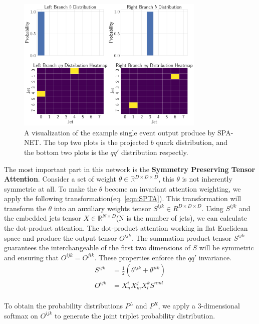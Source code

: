\begin{figure}[H]
	\centering
	\includegraphics[width=0.8\textwidth]{Figures/typical_output.pdf}
	\caption{A visualization of the example single event output produce by SPA-NET. The top two plots is the projected $b$ quark distribution, and the bottom two plots is the $qq'$ distribution respectly. }
	\label{fig:output}
\end{figure}
The most important part in this network is the \textbf{Symmetry Preserving Tensor Attention}. Consider a set of weight $\theta \in \mathbb{R}^{D\times D\times D}$, this $\theta$ is not inherently symmetric at all. To make the $\theta$ become an invariant attention weighting, we apply the following transformation(eq. \ref{eqn:SPTA}). This transformation will transform the $\theta$ into an auxiliary weights tensor $S^{ijk}\in R^{D\times D\times D}$. Using $S^{ijk}$ and the embedded jets tensor $X \in \mathbb{R}^{N\times D}$(N is the number of jets), we can calculate the dot-product attention. The dot-product attention working in flat Euclidean space and produce the output tensor $O^{ijk}$. The summation product tensor $S^{ijk}$ guarantees the interchangeable of the first two dimensions of $S$ will be symmetric and ensuring that $O^{ijk}=O^{jik}$. These properties enforce the $qq'$ invariance.
\\
\begin{equation}\label{eqn:SPTA}
	\begin{split}
	S^{ijk} &= \frac{1}{2}\left( \theta^{ijk} + \theta^{jik}\right) \\
	O^{ijk} &= X^{i}_{n}X^{j}_{m}X^{k}_{l}S^{nml}
		\end{split}
\end{equation}
\\
To obtain the probability distributions $P^{L}$ and $P^{R}$, we apply a 3-dimensional softmax on $O^{ijk}$ to generate the joint triplet probability distribution.
